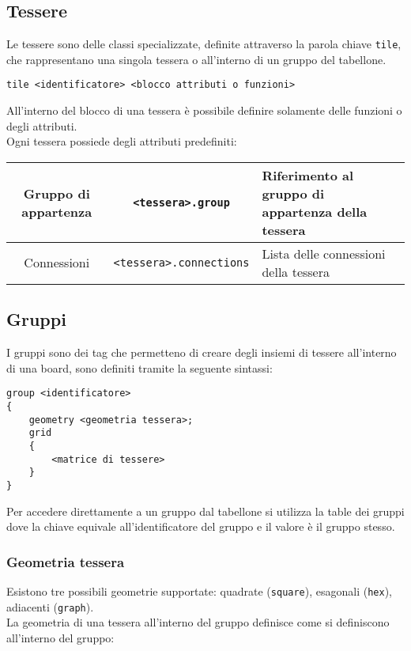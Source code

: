 \subsection{Tessere}
Le tessere sono delle classi specializzate, definite attraverso la parola chiave \lstinline|tile|,
che rappresentano una singola tessera o all'interno di un gruppo del tabellone. \\
\begin{lstlisting}
tile <identificatore> <blocco attributi o funzioni>
\end{lstlisting}
All'interno del blocco di una tessera è possibile definire solamente delle funzioni o degli attributi. \\ 
Ogni tessera possiede degli attributi predefiniti:
\begin{center}
\begin{tabular}{|c|c|p{5cm}|}
    \hline 
    Gruppo di appartenza & \lstinline|<tessera>.group| & Riferimento al gruppo di appartenza della tessera \\ 
    \hline
    Connessioni & \lstinline|<tessera>.connections| & Lista delle connessioni della tessera \\
    \hline 
\end{tabular}
\end{center}

\subsection{Gruppi}
I gruppi sono dei tag che permetteno di creare degli insiemi di tessere all'interno di una board,
sono definiti tramite la seguente sintassi:
\begin{lstlisting}
group <identificatore> 
{
    geometry <geometria tessera>;
    grid 
    {
        <matrice di tessere>
    }
}
\end{lstlisting}
Per accedere direttamente a un gruppo dal tabellone si utilizza la table dei gruppi
dove la chiave equivale all'identificatore del gruppo e il valore è il gruppo stesso.

\subsubsection{Geometria tessera}
Esistono tre possibili geometrie supportate: quadrate (\lstinline|square|), 
esagonali (\lstinline|hex|), adiacenti (\lstinline|graph|). \\
La geometria di una tessera all'interno del gruppo definisce come si definiscono all'interno del gruppo:

